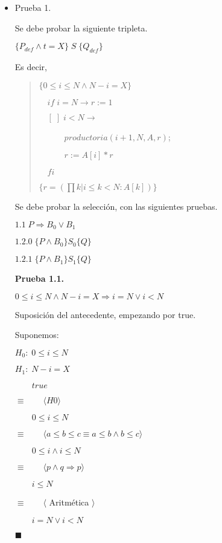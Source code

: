 \documentclass[hidelinks]{article}
\newenvironment{absolutelynopagebreak}
{\Needspace{10\baselineskip}\begin{quote}}
		{\end{quote}}
\begin{document}
\begin{itemize}
	\item Prueba 1.\par
	      Se debe probar la siguiente tripleta.\par
	      $\{P_{def} \land t = X\} \; S \; \{Q_{def}\}$\par
	      Es decir,\par
	      \begin{absolutelynopagebreak}
		      $\{0 \leq i \leq N \land N - i = X\}$\par
		      $\quad  if \; i = N \rightarrow r := 1$\par
		      $\quad  [\;] \; i < N \rightarrow $\par
		      $\quad \qquad productoria(i + 1, N, A, r)$;\par
		      $\quad \qquad r := A[i] * r $\par
		      $\quad  fi$\par
		      $\{r = (\prod k | i \leq k < N: A[k])\}$\par
	      \end{absolutelynopagebreak}

	      Se debe probar la selección, con las siguientes pruebas.\par
	      $1.1 \; P \Rightarrow B_0 \lor B_1$\par
	      $1.2.0 \; \{P \land B_0\} S_0 \{Q\}$\par
	      $1.2.1 \; \{P \land B_1\} S_1 \{Q\}$\par

	      \textbf{Prueba 1.1.}\par
	      $0 \leq i \leq N \land N - i = X \Rightarrow i = N \lor i < N$\par

	      Suposición del antecedente, empezando por true.\par

	      Suponemos:\par
	      $H_0: \; 0 \leq i \leq N$\par
	      $H_1: \; N - i = X$\par

	      $\qquad true$\par
	      $\equiv \qquad \langle H0 \rangle$\par
	      $\qquad 0 \leq i \leq N$\par
	      $\equiv \qquad \langle a \leq b \leq c \equiv a \leq b \land b \leq c \rangle$\par
	      $\qquad 0 \leq i \land i \leq N$\par
	      $\equiv \qquad \langle p \land q \Rightarrow p \rangle$\par
	      $\qquad i \leq N$\par
	      $\equiv \qquad \langle$ Aritmética $\rangle$\par
	      $\qquad i = N \lor i < N$\par
	      $\blacksquare$\par


\end{itemize}
\end{document}
